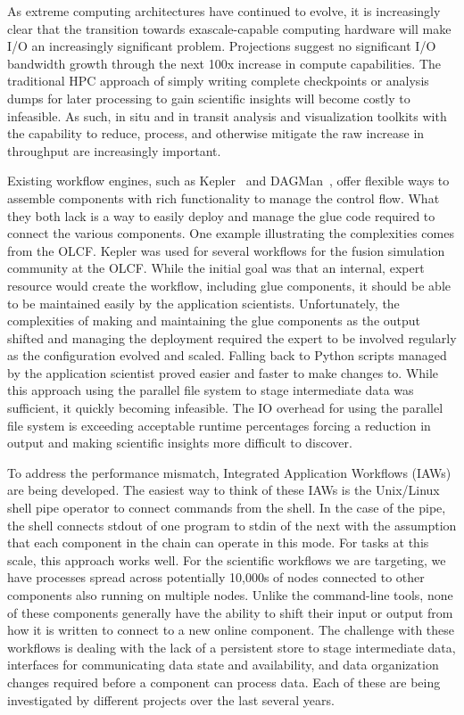\documentclass[conference]{IEEEtran}
\begin{document}
As extreme computing architectures have continued to evolve, it is increasingly
clear that the transition towards exascale-capable computing hardware will make
I/O an increasingly significant problem.  Projections suggest no significant
I/O bandwidth growth through the next 100x increase in compute capabilities.
The traditional HPC approach of simply writing complete checkpoints or analysis
dumps for later processing to gain scientific insights will become costly to
infeasible.  As such, in situ and in transit analysis and visualization
toolkits with the capability to reduce, process, and otherwise mitigate the raw
increase in throughput are increasingly important.

Existing workflow engines, such as Kepler~\cite{bertram:2006:kepler} and
DAGMan~\cite{Malewicz:2006:dagman}, offer flexible ways to assemble components
with rich functionality to manage the control flow. What they both lack is a
way to easily deploy and manage the glue code required to connect the various
components. One example illustrating the complexities comes from the OLCF.
Kepler was used for several workflows for the fusion simulation community at
the OLCF.  While the initial goal was that an internal, expert resource would
create the workflow, including glue components, it should be able to be
maintained easily by the application scientists. Unfortunately, the
complexities of making and maintaining the glue components as the output
shifted and managing the deployment required the expert to be involved
regularly as the configuration evolved and scaled.  Falling back to Python
scripts managed by the application scientist proved easier and faster to make
changes to. While this approach using the parallel file system to stage
intermediate data was sufficient, it quickly becoming infeasible. The IO
overhead for using the parallel file system is exceeding acceptable runtime
percentages forcing a reduction in output and making scientific insights more
difficult to discover.

To address the performance mismatch, Integrated Application Workflows (IAWs)
are being developed. The easiest way to think of these IAWs is the Unix/Linux
shell pipe operator to connect commands from the shell. In the case of the
pipe, the shell connects stdout of one program to stdin of the next with the
assumption that each component in the chain can operate in this mode. For tasks
at this scale, this approach works well. For the scientific workflows we are
targeting, we have processes spread across potentially 10,000s of nodes
connected to other components also running on multiple nodes. Unlike the
command-line tools, none of these components generally have the ability to
shift their input or output from how it is written to connect to a new online
component. The challenge with these workflows is dealing with the lack of a
persistent store to stage intermediate data, interfaces for communicating data
state and availability, and data organization changes required before a
component can process data.  Each of these are being investigated by different
projects over the last several years.
\end{document}
